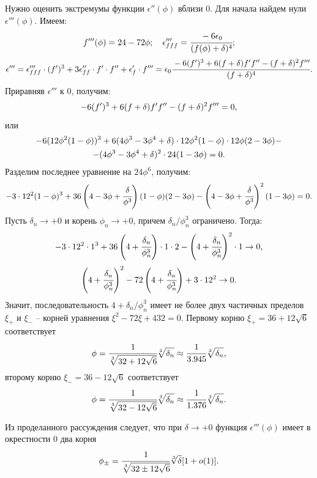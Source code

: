 Нужно оценить экстремумы функции $\epsilon''(\phi)$ вблизи $0$. Для начала найдем нули $\epsilon'''(\phi)$. Имеем:
$$f'''(\phi) = 24 - 72 \phi; \quad \epsilon'''_{fff} = \cfrac{-6 \epsilon_0}{(f(\phi) + \delta)^4} {\text{;}}$$
\begin{equation}
    \epsilon''' = \epsilon'''_{fff} \cdot (f')^3 + 3 \epsilon''_{ff} \cdot f' \cdot f'' + \epsilon'_f \cdot f''' = \epsilon_0 \cfrac{-6 (f')^3 + 6 (f + \delta) f' f'' - (f + \delta)^2 f'''}{(f + \delta)^4} {\text{.}}
    \label{eq:epsilon_phi_phi_phi}
\end{equation}
Приравняв $\epsilon'''$ к $0$, получим:
$$-6 (f')^3 + 6 (f + \delta) f' f'' - (f + \delta)^2 f''' = 0 {\text{,}}$$
или
\begin{multline*}
    -6(12 \phi^2 (1 - \phi))^3 + 6(4 \phi^3 - 3\phi^4 + \delta) \cdot 12 \phi^2 (1 - \phi) \cdot 12 \phi (2 - 3\phi) - \\ - (4 \phi^3 - 3 \phi^4 + \delta)^2 \cdot 24 (1 - 3 \phi) = 0 {\text{.}}
\end{multline*}
Разделим последнее уравнение на $24\phi^6$, получим:
$$-3 \cdot 12^2 (1 - \phi)^3 + 36 \left(4 - 3\phi + \cfrac{\delta}{\phi^3} \right)(1 - \phi)(2 - 3\phi) - \left(4 - 3 \phi + \cfrac{\delta}{\phi^3} \right)^2 (1 - 3 \phi) = 0 {\text{.}}$$
Пусть $\delta_n \to +0$ и корень $\phi_n \to +0$, причем $\delta_n / \phi_n^3$ ограничено. Тогда:
$$-3 \cdot 12^2 \cdot 1^3 + 36 \left(4 + \cfrac{\delta_n}{\phi_n^3} \right) \cdot 1 \cdot 2 - \left(4 + \cfrac{\delta_n}{\phi_n^3} \right)^2 \cdot 1 \to 0 {\text{,}}$$
$$\left(4 + \cfrac{\delta_n}{\phi_n^3} \right)^2 - 72 \left(4 + \cfrac{\delta_n}{\phi_n^3} \right) + 3 \cdot 12^2 \to 0 {\text{.}}$$
Значит, последовательность $4 + \delta_n / \phi_n^3$ имеет не более двух частичных пределов $\xi_+$ и $\xi_-$ -- корней уравнения $\xi^2 - 72 \xi + 432 = 0$. Первому корню $\xi_+ = 36 + 12 \sqrt{6}$ соответствует
$$\phi = \cfrac{1}{\sqrt[3]{32 + 12 \sqrt{6}}} \sqrt[3]{\delta_n} \approx \cfrac{1}{3.945} \sqrt[3]{\delta_n} {\text{,}}$$
второму корню $\xi_- = 36 - 12 \sqrt{6}$ соответствует
$$\phi = \cfrac{1}{\sqrt[3]{32 - 12 \sqrt{6}}} \sqrt[3]{\delta_n} \approx \cfrac{1}{1.376} \sqrt[3]{\delta_n} {\text{.}}$$

Из проделанного рассуждения следует, что при $\delta \to +0$ функция $\epsilon'''(\phi)$ имеет в окрестности $0$ два корня
\begin{equation}
    \phi_{\pm} = \cfrac{1}{\sqrt[3]{32 \pm 12 \sqrt{6}}} \sqrt[3]{\delta} [1 + o(1)] {\text{.}}
    \label{eq:epsilon_phi_phi_phi_roots}
\end{equation}

